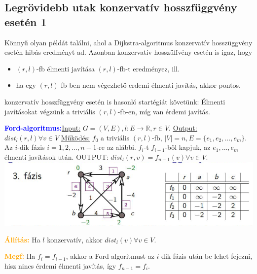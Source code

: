 \documentclass[../szamtud.tex]{subfiles}
\begin{document}
   \subsection{Legrövidebb utak konzervatív hosszfüggvény esetén 1}

        Könnyű olyan példát találni, ahol a Dijkstra-algoritmus konzervatív hosszüggvény esetén hibás eredményt ad. Azonban konzervatív hosszüffvény esetén is igaz, hogy 

        \begin{itemize}
            \item $(r,l)$-fb élmenti javítása $(r,l)$-fb-t eredményez, ill. 
            \item ha egy $(r,l)$-fb-ben nem végezhető erdemi élmenti javítás, akkor pontos.
        \end{itemize}

        konzervatív hosszfüggvény esetén is hasonló startégiát követünk: Élmenti javításokat végzünk a triviális $(r,l)$-fb-en, míg van érdemi javítás.

        \textcolor{blue}{\textbf{Ford-algoritmus:}}\underline{Input:} $G = (V,E), l:E \rightarrow \mathbb{R},r \in V$. \underline{Output:} $dist_l(r,l) \forall v \in V$ \underline{Működés:} $f_0$ a triviális $(r,l)$-fb, $|V| = n, E = \{e_1, e_2, \dots, e_m\}$. Az $i$-dik fázis $i = 1,2,\dots,n-1$-re az alábbi. $f_i$-t $f_{i-1}$-ből kapjuk, az $e_1,\dots,e_m$ élmenti javítások után. OUTPUT: $dist_l(r,v)=f_{n-1}(v) \forall v \in V$. \includegraphics[width=\textwidth]{img/1.png}

        \textcolor{orange}{\textbf{Állítás:}} Ha $l$ konzervatív, akkor $dist_l(v) \forall v \in V$.


        \textcolor{orange}{\textbf{Megf:}} Ha $f_i = f_{i-1}$, akkor a Ford-algoritmust az $i$-dik fázis után be lehet fejezni, hisz nincs érdemi élmenti javítás, így $f_{n-1} = f_i$.
\end{document}
